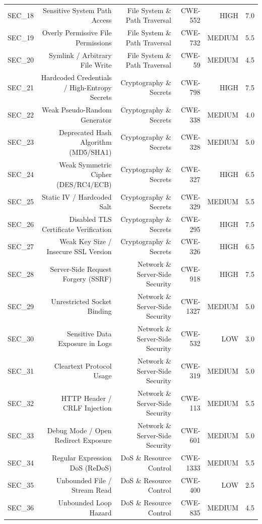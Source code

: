 \begin{table}[htbp]
\begin{tabular}{lrrrrr}
SEC\_18 & Sensitive System Path Access & File System \& Path Traversal & CWE-552 & HIGH & 7.0 \\
SEC\_19 & Overly Permissive File Permissions & File System \& Path Traversal & CWE-732 & MEDIUM & 5.5 \\
SEC\_20 & Symlink / Arbitrary File Write & File System \& Path Traversal & CWE-59 & MEDIUM & 4.5 \\
SEC\_21 & Hardcoded Credentials / High-Entropy Secrets & Cryptography \& Secrets & CWE-798 & HIGH & 7.5 \\
SEC\_22 & Weak Pseudo-Random Generator & Cryptography \& Secrets & CWE-338 & MEDIUM & 4.0 \\
SEC\_23 & Deprecated Hash Algorithm (MD5/SHA1) & Cryptography \& Secrets & CWE-328 & MEDIUM & 5.0 \\
SEC\_24 & Weak Symmetric Cipher (DES/RC4/ECB) & Cryptography \& Secrets & CWE-327 & HIGH & 6.5 \\
SEC\_25 & Static IV / Hardcoded Salt & Cryptography \& Secrets & CWE-329 & MEDIUM & 5.5 \\
SEC\_26 & Disabled TLS Certificate Verification & Cryptography \& Secrets & CWE-295 & HIGH & 7.5 \\
SEC\_27 & Weak Key Size / Insecure SSL Version & Cryptography \& Secrets & CWE-326 & HIGH & 6.5 \\
SEC\_28 & Server-Side Request Forgery (SSRF) & Network \& Server-Side Security & CWE-918 & HIGH & 7.5 \\
SEC\_29 & Unrestricted Socket Binding & Network \& Server-Side Security & CWE-1327 & MEDIUM & 5.0 \\
SEC\_30 & Sensitive Data Exposure in Logs & Network \& Server-Side Security & CWE-532 & LOW & 3.0 \\
SEC\_31 & Cleartext Protocol Usage & Network \& Server-Side Security & CWE-319 & MEDIUM & 5.0 \\
SEC\_32 & HTTP Header / CRLF Injection & Network \& Server-Side Security & CWE-113 & MEDIUM & 5.5 \\
SEC\_33 & Debug Mode / Open Redirect Exposure & Network \& Server-Side Security & CWE-601 & MEDIUM & 5.0 \\
SEC\_34 & Regular Expression DoS (ReDoS) & DoS \& Resource Control & CWE-1333 & MEDIUM & 5.5 \\
SEC\_35 & Unbounded File / Stream Read & DoS \& Resource Control & CWE-400 & LOW & 2.5 \\
SEC\_36 & Unbounded Loop Hazard & DoS \& Resource Control & CWE-835 & MEDIUM & 4.5 \\

\end{tabular}
\end{table}
